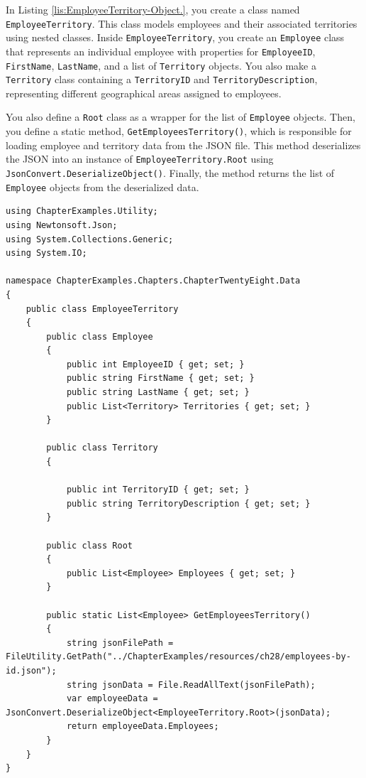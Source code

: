 \documentclass[american,letterpaper]{tufte-book}
\numberwithin{equation}{section}
\numberwithin{figure}{section}
\begin{document}
{{In Listing \ref{lis:EmployeeTerritory-Object.}, you create a class
named \texttt{EmployeeTerritory}. This class models employees and
their associated territories using nested classes. Inside \texttt{EmployeeTerritory},
you create an \texttt{Employee} class that represents an individual
employee with properties for \texttt{EmployeeID}, \texttt{FirstName},
\texttt{LastName}, and a list of \texttt{Territory} objects. You also
make a \texttt{Territory} class containing a \texttt{TerritoryID}
and \texttt{TerritoryDescription}, representing different geographical
areas assigned to employees.

You also define a \texttt{Root} class as a wrapper for the list of
\texttt{Employee} objects. Then, you define a static method, \texttt{GetEmployeesTerritory()},
which is responsible for loading employee and territory data from
the JSON file. This method deserializes the JSON into an instance
of \texttt{EmployeeTerritory.Root} using \texttt{JsonConvert.DeserializeObject()}.
Finally, the method returns the list of \texttt{Employee} objects
from the deserialized data.

\bgroup{}
\begin{lstlisting}[caption={EmployeeTerritory Object.},label={lis:EmployeeTerritory-Object.},basicstyle={\small\ttfamily},breaklines=true]
using ChapterExamples.Utility;
using Newtonsoft.Json;
using System.Collections.Generic;
using System.IO;

namespace ChapterExamples.Chapters.ChapterTwentyEight.Data
{
    public class EmployeeTerritory
    {
        public class Employee
        {
            public int EmployeeID { get; set; }
            public string FirstName { get; set; }
            public string LastName { get; set; }
            public List<Territory> Territories { get; set; }
        }

        public class Territory
        {

            public int TerritoryID { get; set; }
            public string TerritoryDescription { get; set; }       
        }

        public class Root
        {
            public List<Employee> Employees { get; set; }
        }

        public static List<Employee> GetEmployeesTerritory()
        {
            string jsonFilePath = FileUtility.GetPath("../ChapterExamples/resources/ch28/employees-by-id.json");
            string jsonData = File.ReadAllText(jsonFilePath);
            var employeeData = JsonConvert.DeserializeObject<EmployeeTerritory.Root>(jsonData);
            return employeeData.Employees;
        }
    }
}
\end{lstlisting}
\leavevmode\egroup

}}
\end{document}
